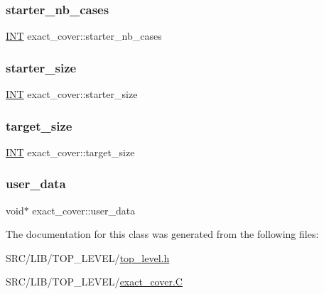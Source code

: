 \mbox{\label{classexact__cover_ab683db45a584b6d20fde47afea5e6566}} 
\subsubsection{\texorpdfstring{starter\+\_\+nb\+\_\+cases}{starter\_nb\_cases}}
{\footnotesize\ttfamily \mbox{\hyperlink{galois_8h_a09fddde158a3a20bd2dcadb609de11dc}{I\+NT}} exact\+\_\+cover\+::starter\+\_\+nb\+\_\+cases}

\mbox{\label{classexact__cover_a2930a79e660bf9afa39c36e5715b00f4}} 
\subsubsection{\texorpdfstring{starter\+\_\+size}{starter\_size}}
{\footnotesize\ttfamily \mbox{\hyperlink{galois_8h_a09fddde158a3a20bd2dcadb609de11dc}{I\+NT}} exact\+\_\+cover\+::starter\+\_\+size}

\mbox{\label{classexact__cover_a368eff6db9702763a0931b959301e091}} 
\subsubsection{\texorpdfstring{target\+\_\+size}{target\_size}}
{\footnotesize\ttfamily \mbox{\hyperlink{galois_8h_a09fddde158a3a20bd2dcadb609de11dc}{I\+NT}} exact\+\_\+cover\+::target\+\_\+size}

\mbox{\label{classexact__cover_ac1543bac5197f35715ff30402385ae4b}} 
\subsubsection{\texorpdfstring{user\+\_\+data}{user\_data}}
{\footnotesize\ttfamily void$\ast$ exact\+\_\+cover\+::user\+\_\+data}



The documentation for this class was generated from the following files\+:\begin{DoxyCompactItemize}
\item 
S\+R\+C/\+L\+I\+B/\+T\+O\+P\+\_\+\+L\+E\+V\+E\+L/\mbox{\hyperlink{top__level_8h}{top\+\_\+level.\+h}}\item 
S\+R\+C/\+L\+I\+B/\+T\+O\+P\+\_\+\+L\+E\+V\+E\+L/\mbox{\hyperlink{exact__cover_8_c}{exact\+\_\+cover.\+C}}\end{DoxyCompactItemize}
